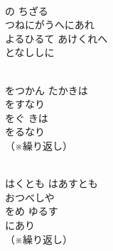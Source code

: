\documentclass[10pt,b5j]{tarticle} %
\begin{document}
\vspace{1.5em} %
\newcommand{\linespace}{0.5em} %
\newcommand{\blocksize}{0.33\hsize} %
\newcommand{\itemmargin}{3em} %
\begin{enumerate} %
    \setlength{\itemindent}{\itemmargin}
    \begin{minipage}[c]{\blocksize}
    
        \vspace{\linespace}
        \item~\\
        の
        ちざる\\
        つねにがうへにあれ\\
        よるひるて
        あけくれへ\\
        となししに\\
        
    \end{minipage}
    \begin{minipage}[c]{\blocksize}

        \vspace{\linespace}
        \item~\\
        をつかん
        たかきは\\
        をすなり\\
        をぐ
        きは\\
        をるなり\\
        （※繰り返し）
        
    \end{minipage}
    \begin{minipage}[c]{\blocksize}
        
        \vspace{\linespace}
        \item~\\
        はくとも
        はあすとも\\
        おつべしや\\
        をめ
        ゆるす\\
        にあり\\
        （※繰り返し）


\end{minipage}
\end{enumerate}
\end{document}
